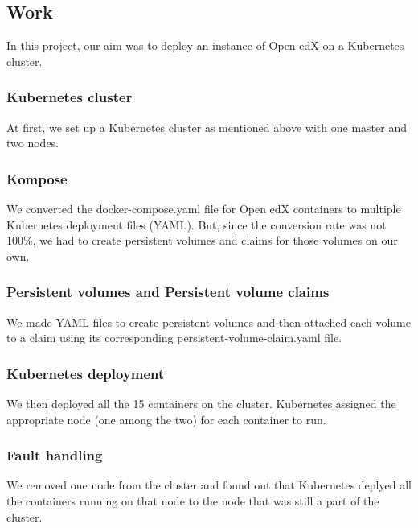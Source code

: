 \documentclass[12pt]{article}
\begin{document}
\subsection{Work}
In this project, our aim was to deploy an instance of Open edX on a Kubernetes cluster.
\subsubsection{Kubernetes cluster}
At first, we set up a Kubernetes cluster as mentioned above with one master and two nodes.
\subsubsection{Kompose}
We converted the docker-compose.yaml file for Open edX containers to multiple Kubernetes deployment files (YAML). But, since the conversion rate was not 100\%, we had to create persistent volumes and claims for those volumes on our own.
\subsubsection{Persistent volumes and Persistent volume claims}
We made YAML files to create persistent volumes and then attached each volume to a claim using its corresponding persistent-volume-claim.yaml file.
\subsubsection{Kubernetes deployment}
We then deployed all the 15 containers on the cluster. Kubernetes assigned the appropriate node (one among the two) for each container to run.
\subsubsection{Fault handling}
We removed one node from the cluster and found out that Kubernetes deplyed all the containers running on that node to the node that was still a part of the cluster.
\end{document}
